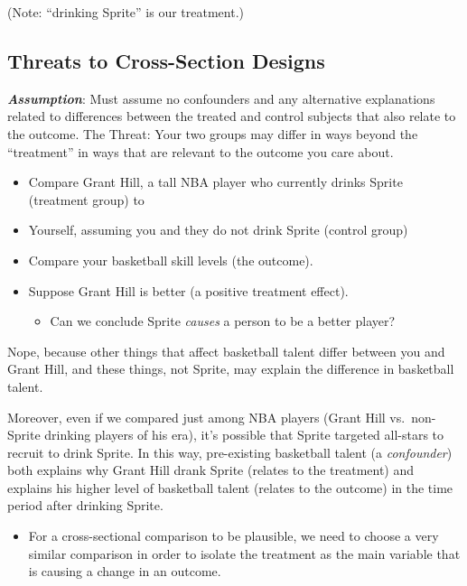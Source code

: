 \documentclass[
  letterpaper,
  DIV=11,
  numbers=noendperiod]{scrreprt}
\providecommand{\tightlist}{%
  \setlength{\itemsep}{0pt}\setlength{\parskip}{0pt}}\usepackage{longtable,booktabs,array}
\begin{document}
(Note: ``drinking Sprite'' is our treatment.)

\hypertarget{threats-to-cross-section-designs}{%
\subsection{Threats to Cross-Section
Designs}\label{threats-to-cross-section-designs}}

\textbf{\emph{Assumption}}: Must assume no confounders and any
alternative explanations related to differences between the treated and
control subjects that also relate to the outcome. The Threat: Your two
groups may differ in ways beyond the ``treatment'' in ways that are
relevant to the outcome you care about.

\begin{itemize}
\tightlist
\item
  Compare Grant Hill, a tall NBA player who currently drinks Sprite
  (treatment group) to
\item
  Yourself, assuming you and they do not drink Sprite (control group)
\item
  Compare your basketball skill levels (the outcome).
\item
  Suppose Grant Hill is better (a positive treatment effect).

  \begin{itemize}
  \tightlist
  \item
    Can we conclude Sprite \emph{causes} a person to be a better player?
  \end{itemize}
\end{itemize}

Nope, because other things that affect basketball talent differ between
you and Grant Hill, and these things, not Sprite, may explain the
difference in basketball talent.

Moreover, even if we compared just among NBA players (Grant Hill
vs.~non-Sprite drinking players of his era), it's possible that Sprite
targeted all-stars to recruit to drink Sprite. In this way, pre-existing
basketball talent (a \emph{confounder}) both explains why Grant Hill
drank Sprite (relates to the treatment) and explains his higher level of
basketball talent (relates to the outcome) in the time period after
drinking Sprite.

\begin{itemize}
\tightlist
\item
  For a cross-sectional comparison to be plausible, we need to choose a
  very similar comparison in order to isolate the treatment as the main
  variable that is causing a change in an outcome.
\end{itemize}
\end{document}
